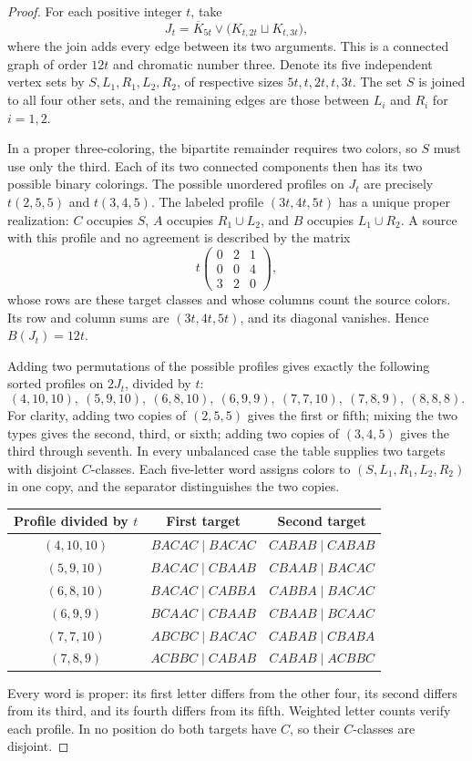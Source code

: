 \documentclass[11pt,reqno]{amsart}
\numberwithin{equation}{section}
\theoremstyle{definition}
\theoremstyle{remark}
\begin{document}
\begin{proof}
For each positive integer $t$, take
\[
 J_t=\overline K_{5t}\vee
       \bigl(K_{t,2t}\sqcup K_{t,3t}\bigr),
\]
where the join adds every edge between its two arguments.
This is a connected graph of order $12t$ and chromatic number three.
Denote its five independent vertex sets by
$S,L_1,R_1,L_2,R_2$, of respective sizes $5t,t,2t,t,3t$.
The set $S$ is joined to all four other sets, and the remaining edges
are those between $L_i$ and $R_i$ for $i=1,2$.

In a proper three-coloring, the bipartite remainder requires two colors,
so $S$ must use only the third. Each of its two connected components
then has its two possible binary colorings. The possible unordered
profiles on $J_t$ are precisely $t(2,5,5)$ and $t(3,4,5)$.
The labeled profile $(3t,4t,5t)$ has a unique proper realization:
$C$ occupies $S$, $A$ occupies $R_1\cup L_2$, and $B$ occupies
$L_1\cup R_2$. A source with this profile and no agreement is described
by the matrix
\[
 t\begin{pmatrix}0&2&1\\0&0&4\\3&2&0\end{pmatrix},
\]
whose rows are these target classes and whose columns count the source
colors. Its row and column sums are $(3t,4t,5t)$, and its diagonal
vanishes. Hence $B(J_t)=12t$.

Adding two permutations of the possible profiles gives exactly the
following sorted profiles on $2J_t$, divided by $t$:
\[
 (4,10,10),\ (5,9,10),\ (6,8,10),\ (6,9,9),\
 (7,7,10),\ (7,8,9),\ (8,8,8).
\]
For clarity, adding two copies of $(2,5,5)$ gives the first or fifth;
mixing the two types gives the second, third, or sixth; adding two
copies of $(3,4,5)$ gives the third through seventh.
In every unbalanced case the table supplies two targets with disjoint
$C$-classes. Each five-letter word assigns colors to
$(S,L_1,R_1,L_2,R_2)$ in one copy, and the separator distinguishes
the two copies.
\begin{center}
\begin{tabular}{c@{\qquad}c@{\qquad}c}
\toprule
Profile divided by $t$ & First target & Second target\\
\midrule
$(4,10,10)$ & $BACAC\mid BACAC$ & $CABAB\mid CABAB$\\
$(5,9,10)$ & $BACAC\mid CBAAB$ & $CBAAB\mid BACAC$\\
$(6,8,10)$ & $BACAC\mid CABBA$ & $CABBA\mid BACAC$\\
$(6,9,9)$ & $BCAAC\mid CBAAB$ & $CBAAB\mid BCAAC$\\
$(7,7,10)$ & $ABCBC\mid BACAC$ & $CABAB\mid CBABA$\\
$(7,8,9)$ & $ACBBC\mid CABAB$ & $CABAB\mid ACBBC$\\
\bottomrule
\end{tabular}
\end{center}
Every word is proper: its first letter differs from the other four,
its second differs from its third, and its fourth differs from its
fifth. Weighted letter counts verify each profile. In no position
do both targets have $C$, so their $C$-classes are disjoint.


\end{proof}
\end{document}
